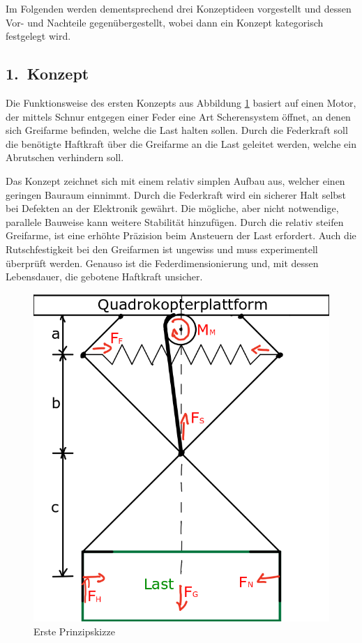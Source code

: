 Im Folgenden werden dementsprechend drei Konzeptideen vorgestellt und dessen Vor- und Nachteile gegenübergestellt, wobei dann ein Konzept kategorisch festgelegt wird.

\subsection{1.~Konzept}
Die Funktionsweise des ersten Konzepts aus Abbildung \ref{erste_prinzipskizze} basiert auf einen Motor, der mittels Schnur entgegen einer Feder eine Art Scherensystem öffnet, an denen sich Greifarme befinden, welche die Last halten sollen. Durch die Federkraft soll die benötigte Haftkraft über die Greifarme an die Last geleitet werden, welche ein Abrutschen verhindern soll.
\par
Das Konzept zeichnet sich mit einem relativ simplen Aufbau aus, welcher einen geringen Bauraum einnimmt. Durch die Federkraft wird ein sicherer Halt selbst bei Defekten an der Elektronik gewährt. Die mögliche, aber nicht notwendige, parallele Bauweise kann weitere Stabilität hinzufügen.
Durch die relativ steifen Greifarme, ist eine erhöhte Präzision beim Ansteuern der Last erfordert. Auch die Rutschfestigkeit bei den Greifarmen ist ungewiss und muss experimentell überprüft werden.
Genauso ist die Federdimensionierung und, mit dessen Lebensdauer, die gebotene Haftkraft unsicher.

\begin{figure}[h]
	\begin{center}
	\includegraphics[scale=0.5]{"Grafiken/Skizze1mechanik.png"}
	\caption{Erste Prinzipskizze}
	\label{erste_prinzipskizze}
	\end{center}
\end{figure}

